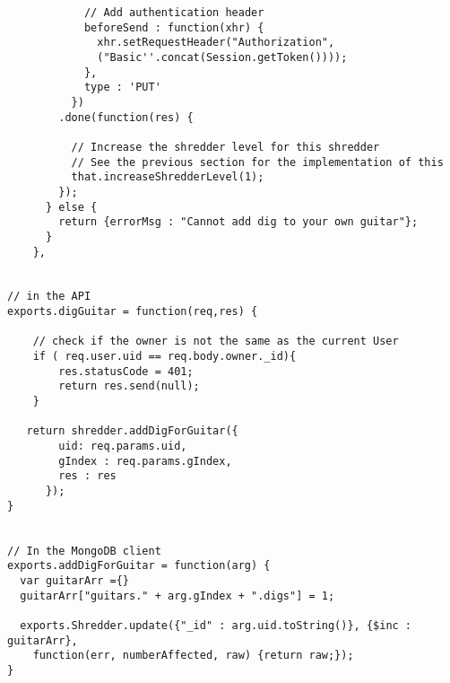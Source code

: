 \begin{lstlisting}
          	// Add authentication header
            beforeSend : function(xhr) {
              xhr.setRequestHeader("Authorization", 
              ("Basic''.concat(Session.getToken())));
            },
            type : 'PUT'
          })
        .done(function(res) {
        
          // Increase the shredder level for this shredder
          // See the previous section for the implementation of this
          that.increaseShredderLevel(1);
        });
      } else {
        return {errorMsg : "Cannot add dig to your own guitar"};
      }
    },
    

// in the API
exports.digGuitar = function(req,res) {

	// check if the owner is not the same as the current User
	if ( req.user.uid == req.body.owner._id){
	    res.statusCode = 401;
	    return res.send(null);
	}

   return shredder.addDigForGuitar({
        uid: req.params.uid, 
        gIndex : req.params.gIndex,
        res : res
      });
}


// In the MongoDB client 
exports.addDigForGuitar = function(arg) {
  var guitarArr ={}
  guitarArr["guitars." + arg.gIndex + ".digs"] = 1;

  exports.Shredder.update({"_id" : arg.uid.toString()}, {$inc : guitarArr},
    function(err, numberAffected, raw) {return raw;});
}
    
\end{lstlisting}